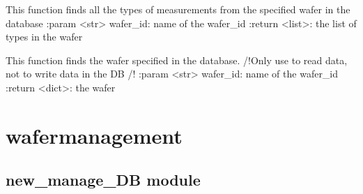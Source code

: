 \documentclass[letterpaper,10pt,english]{sphinxmanual}
\begin{document}

\begin{fulllineitems}
\label{\detokenize{getter:getter.get_types}}
\pysigstartsignatures
{}
\pysigstopsignatures
\sphinxAtStartPar
This function finds all the types of measurements from the specified wafer in the database
:param \textless{}str\textgreater{} wafer\_id: name of the wafer\_id
:return \textless{}list\textgreater{}: the list of types in the wafer

\end{fulllineitems}


\begin{fulllineitems}
\label{\detokenize{getter:getter.get_wafer}}
\pysigstartsignatures
{}
\pysigstopsignatures
\sphinxAtStartPar
This function finds the wafer specified in the database. /!Only use to read data, not to write data in the DB /!
:param \textless{}str\textgreater{} wafer\_id: name of the wafer\_id
:return \textless{}dict\textgreater{}: the wafer

\end{fulllineitems}


\sphinxstepscope


\chapter{wafer\sphinxhyphen{}management}
\label{\detokenize{modules:wafer-management}}\label{\detokenize{modules::doc}}
\sphinxstepscope


\section{new\_manage\_DB module}
\label{\detokenize{new_manage_DB:module-new_manage_DB}}\label{\detokenize{new_manage_DB:new-manage-db-module}}\label{\detokenize{new_manage_DB::doc}}
\end{document}
